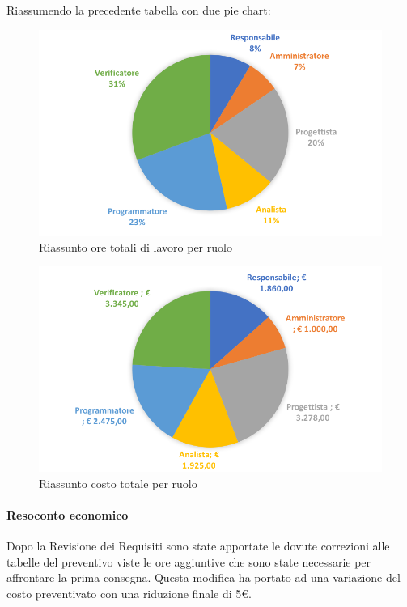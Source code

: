\documentclass[../PianoDiProgetto.tex]{subfiles}
\begin{document}
			Riassumendo la precedente tabella con due pie chart:	
			\begin{figure}[!h]
				\centering
				\includegraphics[width=\textwidth]{Preventivo/Immagini/rendicontato_oreRuolo.png}
				\caption{Riassunto ore totali di lavoro per ruolo}
			\end{figure}	
			\newpage
			\begin{figure}[!h]
				\centering
				\includegraphics[width=\textwidth]{Preventivo/Immagini/rendicontato_costoRuolo.png}
				\caption{Riassunto costo totale per ruolo}
			\end{figure}
			
			\paragraph{Resoconto economico} Dopo la Revisione dei Requisiti sono state apportate le dovute correzioni alle tabelle del preventivo viste le ore aggiuntive che sono state necessarie per affrontare la prima consegna. Questa modifica ha portato ad una variazione del costo preventivato con una riduzione finale di 5\euro.
\end{document}
